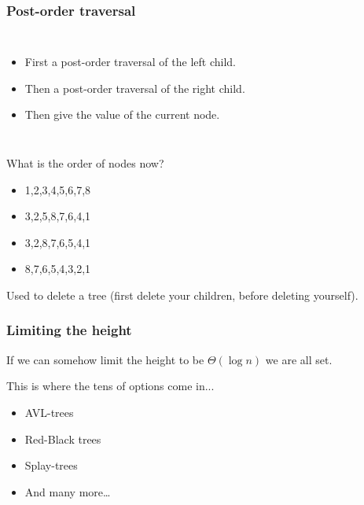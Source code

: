 \begin{frame}
	\frametitle{Post-order traversal}
			\begin{columns}[T]
				\begin{itemize}
					\item First a post-order traversal of the left child.
					\item Then a post-order traversal of the right child.
					\item Then give the value of the current node.
				\end{itemize}
			\end{columns}
				What is the order of nodes now?
					\begin{itemize}
						\item 1,2,3,4,5,6,7,8
						\item 3,2,5,8,7,6,4,1
						\item 3,2,8,7,6,5,4,1
						\item 8,7,6,5,4,3,2,1
					\end{itemize}

				Used to delete a tree (first delete your children, before deleting yourself).

\end{frame}

\begin{frame}
	\frametitle{Limiting the height}
		If we can somehow limit the height to be $\Theta(\log n)$ we are all set.
	
	This is where the tens of options come in...
	\begin{itemize}
		\item AVL-trees
		\item Red-Black trees
		\item Splay-trees
		\item And many more\dots
	\end{itemize}
\end{frame}

